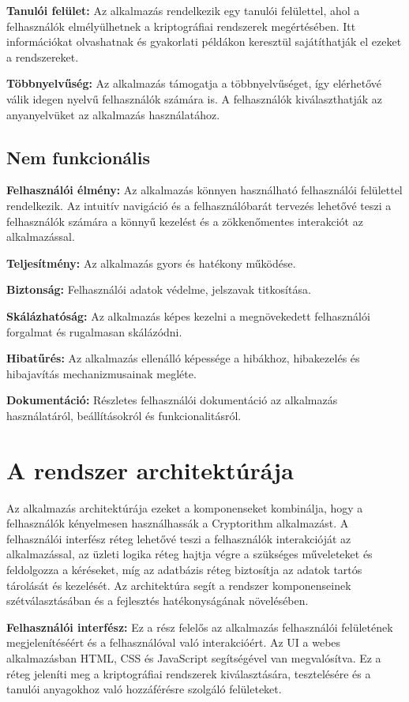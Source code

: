 \textbf{Tanulói felület:} Az alkalmazás rendelkezik egy tanulói felülettel, ahol a felhasználók elmélyülhetnek a kriptográfiai rendszerek megértésében. Itt információkat olvashatnak és gyakorlati példákon keresztül sajátíthatják el ezeket a rendszereket.

\textbf{Többnyelvűség:} Az alkalmazás támogatja a többnyelvűséget, így elérhetővé válik idegen nyelvű felhasználók számára is. A felhasználók kiválaszthatják az anyanyelvüket az alkalmazás használatához.

\subsection{Nem funkcionális}

\textbf{Felhasználói élmény:} Az alkalmazás könnyen használható felhasználói felülettel rendelkezik. Az intuitív navigáció és a felhasználóbarát tervezés lehetővé teszi a felhasználók számára a könnyű kezelést és a zökkenőmentes interakciót az alkalmazással.

\textbf{Teljesítmény:} Az alkalmazás gyors és hatékony működése.

\textbf{Biztonság:} Felhasználói adatok védelme, jelszavak titkosítása.

\textbf{Skálázhatóság:} Az alkalmazás képes kezelni a megnövekedett felhasználói forgalmat és rugalmasan skálázódni.

\textbf{Hibatűrés:} Az alkalmazás ellenálló képessége a hibákhoz, hibakezelés és hibajavítás mechanizmusainak megléte.

\textbf{Dokumentáció:} Részletes felhasználói dokumentáció az alkalmazás használatáról, beállításokról és funkcionalitásról.


\section{A rendszer architektúrája}
Az alkalmazás architektúrája ezeket a komponenseket kombinálja, hogy a felhasználók kényelmesen használhassák a Cryptorithm alkalmazást. A felhasználói interfész réteg lehetővé teszi a felhasználók interakcióját az alkalmazással, az üzleti logika réteg hajtja végre a szükséges műveleteket és feldolgozza a kéréseket, míg az adatbázis réteg biztosítja az adatok tartós tárolását és kezelését. Az architektúra segít a rendszer komponenseinek szétválasztásában és a fejlesztés hatékonyságának növelésében.

\textbf{Felhasználói interfész:} Ez a rész felelős az alkalmazás felhasználói felületének megjelenítéséért és a felhasználóval való interakcióért. Az UI a webes alkalmazásban HTML, CSS és JavaScript segítségével van megvalósítva. Ez a réteg jeleníti meg a kriptográfiai rendszerek kiválasztására, tesztelésére és a tanulói anyagokhoz való hozzáférésre szolgáló felületeket.

